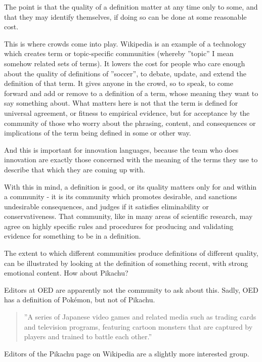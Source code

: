 The point is that the quality of a definition matter at any time only to some, and that they may identify themselves, if doing so can be done at some reasonable cost. 

This is where crowds come into play. Wikipedia is an example of a technology which creates term or topic-specific communities (whereby ''topic'' I mean somehow related sets of terms). It lowers the cost for people who care enough about the quality of definitions of ''soccer'', to debate, update, and extend the definition of that term. It gives anyone in the crowd, so to speak, to come forward and add or remove to a definition of a term, whose meaning they want to say something about. What matters here is not that the term is defined for universal agreement, or fitness to empirical evidence, but for acceptance by the community of those who worry about the phrasing, content, and consequences or implications of the term being defined in some or other way.

And this is important for innovation languages, because the team who does innovation are exactly those concerned with the meaning of the terms they use to describe that which they are coming up with.

With this in mind, a definition is good, or its quality matters only for and within a community - it is its community which promotes desirable, and sanctions undesirable consequences, and judges if it satisfies eliminability or conservativeness. That community, like in many areas of scientific research, may agree on highly specific rules and procedures for producing and validating evidence for something to be in a definition.

The extent to which different communities produce definitions of different quality, can be illustrated by looking at the definition of something recent, with strong emotional content. How about Pikachu?

Editors at OED are apparently not the community to ask about this. Sadly, OED has a definition of Pok\'{e}mon, but not of Pikachu.

\begin{quote}
''A series of Japanese video games and related media such as trading cards and television programs, featuring cartoon monsters that are captured by players and trained to battle each other.'' \cite{def-pokemon}
\end{quote}

Editors of the Pikachu page on Wikipedia are a slightly more interested group.

